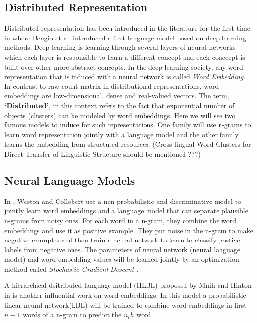 \documentclass[preprint,12pt]{elsarticle}
\begin{document}
\subsection{Distributed Representation}
\label{rel-work:disted-repr}
Distributed representation has been introduced in the literature for the first
time in \cite{Bengio2003} where Bengio et al. introduced a first language
model based on deep learning methods\cite{Bengio2009b}. Deep learning is
learning through several layers of neural networks which each layer is
responsible to learn a different concept and each concecpt is built over other
more abstract concepts. In the deep learning society, any word representation
that is induced with a neural network is called \emph{Word Embedding}. 
In contrast to raw count matrix in distributional representations, word embeddings are low-dimensional, dense and real-valued vectors.
 The term, \textbf{`Distributed'}, in this context refers to the fact that
 exponential number of objects (clusters) can be modeled by word embeddings.
 Here we will see two famous models to induce for such representations. One
 family will use n-grams to learn word representation jointly with a language
 model and the other family learns the embedding from structured resources.
(Cross-lingual Word Clusters for Direct Transfer of Linguistic Structure should be mentioned ???)

\subsection{Neural Language Models}
\label{rel-work:lang-model}

In \cite{Collobert2008a}, Weston and Collobert use a non-probabilistic and
discriminative model to jointly learn word embeddings and a language model that
can separate plausible n-grams from noisy ones. For each word in a n-gram, they
combine the word embeddings and use it as positive example. They put noise in
the n-gram to make negative examples and then train a neural network to learn to
classify postive labels from negative ones. The parameters of neural network
(neural language model) and word embedding values will be learned jointly by an
optimization method called \emph{Stochastic Gradient Descent} \cite{Bottou2010}.

A hierarchical dsitributed language model (HLBL) proposed by Mnih and
Hinton in \cite{Mnih2009} is another influential work on word embeddings. In
this model a probabilistic linear neural network(LBL) will be trained to 
combine word embeddings in first $n-1$ words of a n-gram to predict the $n_th$ word.
\end{document}
